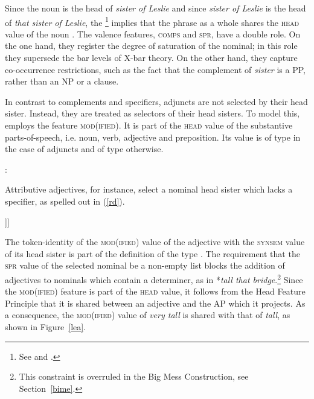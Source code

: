 \documentclass[output=paper
	        ,collection
	        ,collectionchapter
 	        ,biblatex
                ,babelshorthands
                ,newtxmath
                ,draftmode
                ,colorlinks, citecolor=brown
]{langscibook}
\begin{document}
Since the noun is the head of \emph{sister of Leslie} and since \emph{sister of Leslie} is 
the head of \emph{that sister of Leslie}, the \footnote{%
See \citet[34]{ps2} and .
} implies that the phrase as a whole shares the \textsc{head} value of the noun . 
The valence features, \textsc{comps} and \textsc{spr}, have a double role. 
On the one hand, they register the degree of saturation of the nominal; 
in this role they supersede the bar levels of X-bar theory. 
On the other hand, they capture co-occurrence restrictions, 
such as the fact that the complement of \emph{sister} is a PP, rather than an NP or a clause.

In contrast to complements and specifiers, adjuncts are not selected by their 
head sister. Instead, they are treated as selectors of their head sisters. 
To model this, \citet[55--57]{ps2} employs the feature \textsc{mod(ified)}. 
It is part of the \textsc{head} value of the substantive parts-of-speech, 
i.e. noun, verb, adjective and preposition. Its value is of type  
in the case of adjuncts and of type  otherwise.

\begin{exe} 
\ex   {}: \begin{avm} 
                          \end{avm} 
\end{exe} 

\noindent
Attributive adjectives, for instance, select a nominal head sister 
which lacks a specifier, as spelled out in (\ref{rd}). 

\begin{exe} 
\ex\label{rd}
\begin{avm}
[\type{category}                              \\
 head [\type{adjective}                       \\
       mod|loc|category [head & \type{noun}   \\
                         spr  & \type{nelist}]]]
\end{avm}
\end{exe}

\noindent
The token-identity of the \textsc{mod(ified)} value of the adjective
with the \textsc{synsem} value of its head sister is part of the 
definition of the type  . 
The requirement that the \textsc{spr} value of the selected nominal be a non-empty list
blocks the addition of adjectives to nominals which contain a 
determiner, as in *\emph{tall that bridge}.\footnote{This constraint is 
overruled in the Big Mess Construction, see Section~\ref{bime}.} 
Since the \textsc{mod(ified)} feature is part of the \textsc{head} value, 
it follows from the Head Feature Principle that it is shared between an adjective 
and the AP which it projects. As a consequence, the \textsc{mod(ified)} value of 
\emph{very tall} is shared with that of \emph{tall}, as shown in Figure~\ref{lea}. 
\end{document}
